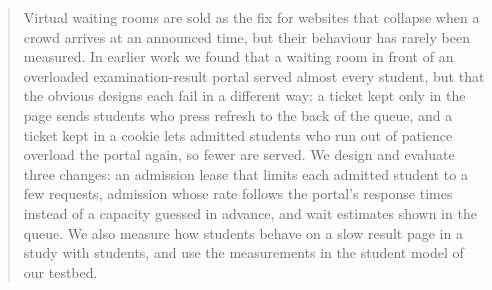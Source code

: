 \begin{abstract}
Virtual waiting rooms are sold as the fix for websites that collapse when a
crowd arrives at an announced time, but their behaviour has rarely been
measured. In earlier work we found that a waiting room in front of an
overloaded examination-result portal served almost every student, but that
the obvious designs each fail in a different way: a ticket kept only in the
page sends students who press refresh to the back of the queue, and a ticket
kept in a cookie lets admitted students who run out of patience overload the
portal again, so fewer are served. We design and evaluate three changes: an
admission lease that limits each admitted student to a few requests,
admission whose rate follows the portal's response times instead of a
capacity guessed in advance, and wait estimates shown in the queue. We also
measure how students behave on a slow result page in a study with
 students, and use the measurements in the student model of our
testbed. 
\end{abstract}
